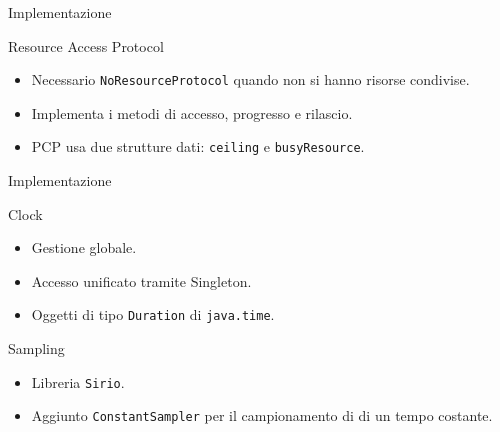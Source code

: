\begin{frame}{Implementazione}
    \begin{block}{Resource Access Protocol}
        \begin{itemize}
            \item Necessario \texttt{NoResourceProtocol} quando non si hanno risorse condivise.
            \item Implementa i metodi di accesso, progresso e rilascio.
            \item PCP usa due strutture dati: \texttt{ceiling} e \texttt{busyResource}.
        \end{itemize}
    \end{block}
\end{frame}

\begin{frame}{Implementazione}
    \begin{block}{Clock}
        \begin{itemize}
            \item Gestione globale.
            \item Accesso unificato tramite Singleton.
            \item Oggetti di tipo \texttt{Duration} di \texttt{java.time}.
        \end{itemize}
    \end{block}
    \begin{block}{Sampling}
        \begin{itemize}
            \item Libreria \texttt{Sirio}.
            \item Aggiunto \texttt{ConstantSampler} per il campionamento di di un tempo costante.
        \end{itemize}
    \end{block}
\end{frame}